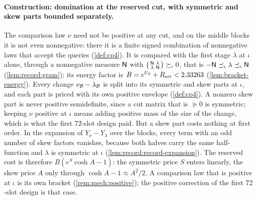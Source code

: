 \paragraph{Construction: domination at the reserved cut, with symmetric and skew parts bounded separately.}
The comparison law $\nu$ need not be positive at any cut, and on the middle
blocks it is not even nonnegative: there it is a finite signed combination of
nonnegative laws that accept the queries (\cref{def:cp4}). It is compared with
the first stage $\lambda$ at $\iota$ alone, through a nonnegative measure
$\mathsf N$ with
$\bigl(\begin{smallmatrix}\mathsf N&\lambda\\ \lambda&\mathsf N\end{smallmatrix}\bigr)
\succeq_\iota0$, that is $-\mathsf N\preceq_\iota\lambda\preceq_\iota\mathsf N$
(\cref{lem:record:gram}); its energy factor is $B=e^{U_0}+R_{\rm err}<2.33263$
(\cref{lem:bracket-energy}). Every change $\nu_\mathcal B-\lambda_\mathcal B$ is split into
its symmetric and skew parts at $\iota$, and each part is priced with its own
positive envelope (\cref{def:cp4}). A nonzero skew part is never positive
semidefinite, since a cut matrix that is $\succeq0$ is symmetric; keeping $\nu$
positive at $\iota$ means adding positive mass of the size of the change,
which is what the first $72$-slot design paid. But a skew part costs nothing at
first order. In the expansion of $Y_\nu-Y_\lambda$ over the blocks, every term
with an odd number of skew factors vanishes, because both halves carry the
same half-function and $\lambda$ is symmetric at $\iota$
(\cref{lem:record:record-expansion}). The reserved cost is therefore
$B(e^S\cosh A-1)$: the symmetric price $S$ enters linearly, the skew price $A$
only through $\cosh A-1\approx A^2/2$. A comparison law that is positive at
$\iota$ is its own bracket (\cref{rem:mech:positive}); the positive
correction of the first $72$-slot design is that case.

